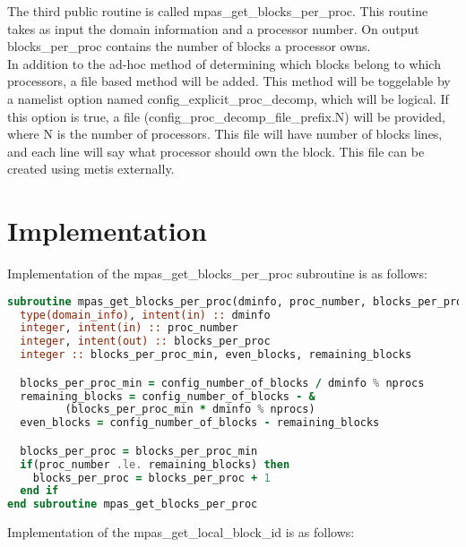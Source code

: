 \documentclass[11pt]{report}
\begin{document}
The third public routine is called mpas\_get\_blocks\_per\_proc. This routine
takes as input the domain information and a processor number. On output
blocks\_per\_proc contains the number of blocks a processor owns. \\

In addition to the ad-hoc method of determining which blocks belong to which
processors, a file based method will be added. This method will be toggelable
by a namelist option named config\_explicit\_proc\_decomp, which will be logical.
If this option is true, a file (config\_proc\_decomp\_file\_prefix.N) will be
provided, where N is the number of processors. This file will have number of
blocks lines, and each line will say what processor should own the block. This
file can be created using metis externally. \\


%
%

\chapter{Implementation}

Implementation of the mpas\_get\_blocks\_per\_proc subroutine is as follows:

\begin{lstlisting}[language=fortran,escapechar=@,frame=single]
subroutine mpas_get_blocks_per_proc(dminfo, proc_number, blocks_per_proc)
  type(domain_info), intent(in) :: dminfo
  integer, intent(in) :: proc_number
  integer, intent(out) :: blocks_per_proc
  integer :: blocks_per_proc_min, even_blocks, remaining_blocks

  blocks_per_proc_min = config_number_of_blocks / dminfo % nprocs
  remaining_blocks = config_number_of_blocks - &
         (blocks_per_proc_min * dminfo % nprocs)
  even_blocks = config_number_of_blocks - remaining_blocks

  blocks_per_proc = blocks_per_proc_min
  if(proc_number .le. remaining_blocks) then
    blocks_per_proc = blocks_per_proc + 1
  end if
end subroutine mpas_get_blocks_per_proc
\end{lstlisting}

\pagebreak

Implementation of the mpas\_get\_local\_block\_id is as follows:
\end{document}

